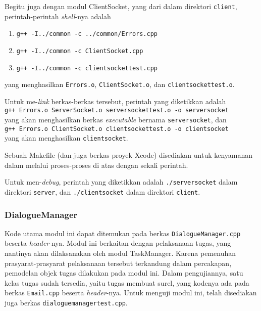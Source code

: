 Begitu juga dengan modul ClientSocket,
yang dari dalam direktori \texttt{client},
perintah-perintah \textit{shell}-nya adalah
\begin{enumerate}
\item \verb!g++ -I../common -c ../common/Errors.cpp!
\item \verb!g++ -I../common -c ClientSocket.cpp!
\item \verb!g++ -I../common -c clientsockettest.cpp!
\end{enumerate}
yang menghasilkan \texttt{Errors.o}, \texttt{ClientSocket.o}, dan \texttt{clientsockettest.o}.

Untuk me-\textit{link} berkas-berkas tersebut,
perintah yang diketikkan adalah\\
\verb!g++ Errors.o ServerSocket.o serversockettest.o -o serversocket!\\
yang akan menghasilkan berkas \textit{executable} bernama \texttt{serversocket}, dan\\
\verb!g++ Errors.o ClientSocket.o clientsockettest.o -o clientsocket!\\
yang akan menghasilkan \texttt{clientsocket}.

Sebuah Makefile (dan juga berkas proyek Xcode) disediakan untuk kenyamanan dalam melalui proses-proses di atas dengan sekali perintah.

Untuk men-\textit{debug},
perintah yang diketikkan adalah \verb!./serversocket! dalam direktori \texttt{server},
dan \verb!./clientsocket! dalam direktori \texttt{client}.


\subsubsection*{DialogueManager}

Kode utama modul ini dapat ditemukan pada berkas \texttt{DialogueManager.cpp} beserta \textit{header}-nya.
Modul ini berkaitan dengan pelaksanaan tugas,
yang nantinya akan dilaksanakan oleh modul TaskManager.
Karena pemenuhan prasyarat-prasyarat pelaksanaan tersebut terkandung dalam percakapan,
pemodelan objek tugas dilakukan pada modul ini.
Dalam pengujiannya, satu kelas tugas sudah tersedia, yaitu tugas membuat surel,
yang kodenya ada pada berkas \texttt{Email.cpp} beserta \textit{header}-nya.
Untuk menguji modul ini, telah disediakan juga berkas \texttt{dialoguemanagertest.cpp}.

